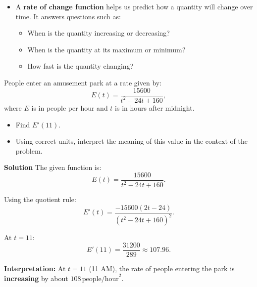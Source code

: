 \documentclass[12pt]{article}
\theoremstyle{beautifulthm}
\begin{document}
\begin{itemize}
    \item A \textbf{rate of change function} helps us predict how a quantity will change over time. It answers questions such as:
    \begin{itemize}
        \item When is the quantity increasing or decreasing?
        \item When is the quantity at its maximum or minimum?
        \item How fast is the quantity changing?
    \end{itemize}
\end{itemize}


\begin{tcolorbox}[colback=examplebg, colframe=red!75!black, title=\textbf{EXAMPLE 1:Rates of Change}, fonttitle=\bfseries, sharp corners]
People enter an amusement park at a rate given by:
\[
E(t) = \frac{15600}{t^2 - 24t + 160},
\]
where \( E \) is in people per hour and \( t \) is in hours after midnight. 

\begin{itemize}
    \item Find \( E'(11) \).
    \item Using correct units, interpret the meaning of this value in the context of the problem.
\end{itemize}

\tcblower
\textbf{Solution}
The given function is:
\[
E(t) = \frac{15600}{t^2 - 24t + 160}.
\]

Using the quotient rule:
\[
E'(t) = \frac{-15600(2t - 24)}{(t^2 - 24t + 160)^2}.
\]

At \( t = 11 \):
\[
E'(11) = \frac{31200}{289} \approx 107.96.
\]

\textbf{Interpretation:} At \( t = 11 \) (11 AM), the rate of people entering the park is \textbf{increasing} by about \( 108 \, \text{people/hour}^2 \).

\end{tcolorbox}
\end{document}
